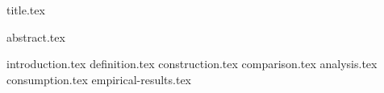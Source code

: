 \documentclass[11pt]{llncs}
\begin{document}
{title.tex}

{abstract.tex}

\ifccs
\maketitle
\fi

\iflncs
\thispagestyle{plain}
\fi

{introduction.tex}
{definition.tex}
{construction.tex}
{comparison.tex}
{analysis.tex}
{consumption.tex}
{empirical-results.tex}

\newpage
\ifccs
  
\else
  
\fi


\end{document}
